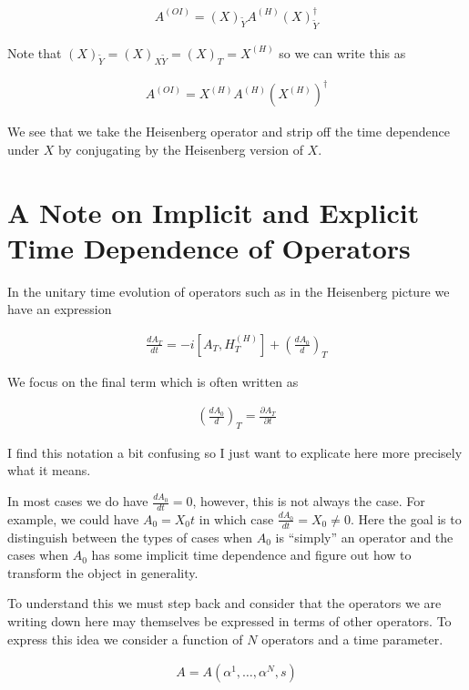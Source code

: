 \documentclass[12pt]{article}
\newcommand{\ddt}[1]{\frac{d #1}{dt}}
\begin{document}
\begin{align}
A^{(OI)} = (X)_{\tilde{Y}}A^{(H)}(X)_{\tilde{Y}}^{\dag}
\end{align}

Note that $(X)_{\tilde{Y}} = (X)_{X\tilde{Y}} = (X)_T = X^{(H)}$ so we can write this as

\begin{align}
A^{(OI)} = X^{(H)}A^{(H)}\left(X^{(H)}\right)^{\dag}
\end{align}

We see that we take the Heisenberg operator and strip off the time dependence under $X$ by conjugating by the Heisenberg version of $X$.

\section{A Note on Implicit and Explicit Time Dependence of Operators}

In the unitary time evolution of operators such as in the Heisenberg picture we have an expression

\begin{align}
\frac{dA_T}{dt} = -i\left[A_T, H_T^{(H)}\right] + \left(\frac{d A_0}{d}\right)_T
\end{align}

We focus on the final term which is often written as

\begin{align}
\left(\frac{d A_0}{d}\right)_T = \frac{\partial A_T}{\partial t}
\end{align}

I find this notation a bit confusing so I just want to explicate here more precisely what it means.

In most cases we do have $\ddt{A_0} = 0$, however, this is not always the case. For example, we could have $A_0 = X_0 t$ in which case $\ddt{A_0} = X_0 \neq 0$. Here the goal is to distinguish between the types of cases when $A_0$ is ``simply'' an operator and the cases when $A_0$ has some implicit time dependence and figure out how to transform the object in generality.

To understand this we must step back and consider that the operators we are writing down here may themselves be expressed in terms of other operators.
To express this idea we consider a function of $N$ operators and a time parameter.

\begin{align}
A = A(\alpha^1, \ldots, \alpha^N, s)
\end{align}
\end{document}
